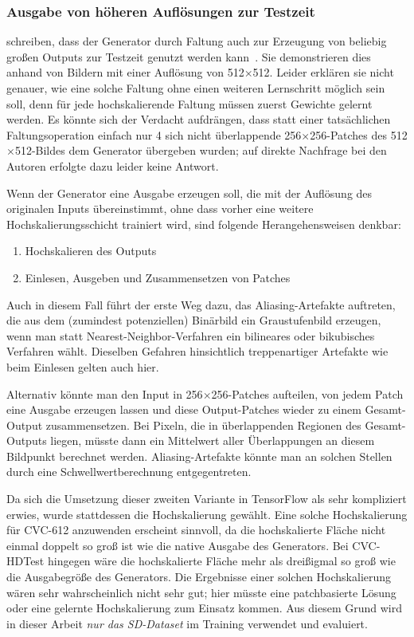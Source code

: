 \subsubsection{Ausgabe von höheren Auflösungen zur Testzeit}

\citeauthor{Isola.2017} schreiben, dass der Generator durch Faltung auch zur Erzeugung von beliebig großen Outputs zur Testzeit genutzt werden kann~\cite{Isola.2017}.
Sie demonstrieren dies anhand von Bildern mit einer Auflösung von 512$\times$512.
Leider erklären sie nicht genauer, wie eine solche Faltung ohne einen weiteren Lernschritt möglich sein soll, denn für jede hochskalierende Faltung müssen zuerst Gewichte gelernt werden.
Es könnte sich der Verdacht aufdrängen, dass statt einer tatsächlichen Faltungsoperation einfach nur 4 sich nicht überlappende 256$\times$256-Patches des 512$\times$512-Bildes dem Generator übergeben wurden; auf direkte Nachfrage bei den Autoren erfolgte dazu leider keine Antwort.

Wenn der Generator eine Ausgabe erzeugen soll, die mit der Auflösung des originalen Inputs übereinstimmt, ohne dass vorher eine weitere Hochskalierungsschicht trainiert wird, sind folgende Herangehensweisen denkbar:

\begin{enumerate}
	\item Hochskalieren des Outputs
	\item Einlesen, Ausgeben und Zusammensetzen von Patches
\end{enumerate}

Auch in diesem Fall führt der erste Weg dazu, das Aliasing-Artefakte auftreten, die aus dem (zumindest potenziellen) Binärbild ein Graustufenbild erzeugen, wenn man statt Nearest-Neighbor-Verfahren ein bilineares oder bikubisches Verfahren wählt.
Dieselben Gefahren hinsichtlich treppenartiger Artefakte wie beim Einlesen gelten auch hier.

Alternativ könnte man den Input in 256$\times$256-Patches aufteilen, von jedem Patch eine Ausgabe erzeugen lassen und diese Output-Patches wieder zu einem Gesamt-Output zusammensetzen.
Bei Pixeln, die in überlappenden Regionen des Gesamt-Outputs liegen, müsste dann ein Mittelwert aller Überlappungen an diesem Bildpunkt berechnet werden.
Aliasing-Artefakte könnte man an solchen Stellen durch eine Schwellwertberechnung entgegentreten.

Da sich die Umsetzung dieser zweiten Variante in TensorFlow als sehr kompliziert erwies, wurde stattdessen die Hochskalierung gewählt.
Eine solche Hochskalierung für CVC-612 anzuwenden erscheint sinnvoll, da die hochskalierte Fläche nicht einmal doppelt so groß ist wie die native Ausgabe des Generators.
Bei CVC-HDTest hingegen wäre die hochskalierte Fläche mehr als dreißigmal so groß wie die Ausgabegröße des Generators.
Die Ergebnisse einer solchen Hochskalierung wären sehr wahrscheinlich nicht sehr gut; hier müsste eine patchbasierte Lösung oder eine gelernte Hochskalierung zum Einsatz kommen.
Aus diesem Grund wird in dieser Arbeit \emph{nur das SD-Dataset} im Training verwendet und evaluiert.



